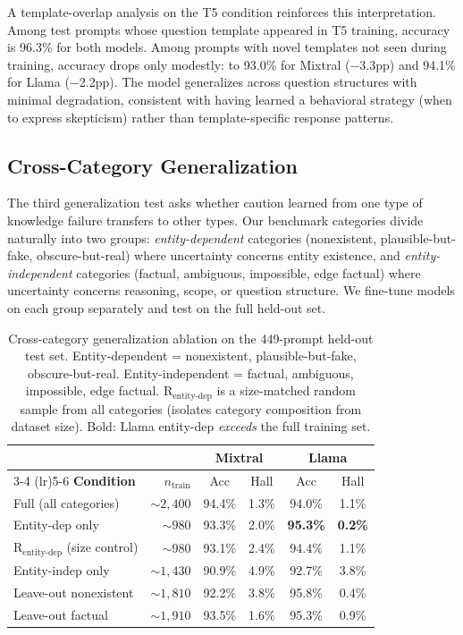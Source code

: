 A template-overlap analysis on the T5 condition reinforces this interpretation. Among test prompts whose question template appeared in T5 training, accuracy is 96.3\% for both models. Among prompts with novel templates not seen during training, accuracy drops only modestly: to 93.0\% for Mixtral ($-$3.3pp) and 94.1\% for Llama ($-$2.2pp). The model generalizes across question structures with minimal degradation, consistent with having learned a behavioral strategy (when to express skepticism) rather than template-specific response patterns.

\subsection{Cross-Category Generalization}
\label{sec:cross-category}

The third generalization test asks whether caution learned from one type of knowledge failure transfers to other types. Our benchmark categories divide naturally into two groups: \emph{entity-dependent} categories (nonexistent, plausible-but-fake, obscure-but-real) where uncertainty concerns entity existence, and \emph{entity-independent} categories (factual, ambiguous, impossible, edge factual) where uncertainty concerns reasoning, scope, or question structure. We fine-tune models on each group separately and test on the full held-out set.

\begin{table}[ht]
\centering
\small
\begin{tabular}{@{}lrcccc@{}}
\toprule
& & \multicolumn{2}{c}{\textbf{Mixtral}} & \multicolumn{2}{c}{\textbf{Llama}} \\
\cmidrule(lr){3-4} \cmidrule(lr){5-6}
\textbf{Condition} & $n_{\text{train}}$ & Acc & Hall & Acc & Hall \\
\midrule
Full (all categories) & ${\sim}2{,}400$ & 94.4\% & 1.3\% & 94.0\% & 1.1\% \\
Entity-dep only & ${\sim}980$ & 93.3\% & 2.0\% & \textbf{95.3\%} & \textbf{0.2\%} \\
R$_{\text{entity-dep}}$ (size control) & ${\sim}980$ & 93.1\% & 2.4\% & 94.4\% & 1.1\% \\
Entity-indep only & ${\sim}1{,}430$ & 90.9\% & 4.9\% & 92.7\% & 3.8\% \\
\addlinespace
Leave-out nonexistent & ${\sim}1{,}810$ & 92.2\% & 3.8\% & 95.8\% & 0.4\% \\
Leave-out factual & ${\sim}1{,}910$ & 93.5\% & 1.6\% & 95.3\% & 0.9\% \\
\bottomrule
\end{tabular}
\caption{Cross-category generalization ablation on the 449-prompt held-out test set. Entity-dependent = nonexistent, plausible-but-fake, obscure-but-real. Entity-independent = factual, ambiguous, impossible, edge factual. R$_{\text{entity-dep}}$ is a size-matched random sample from all categories (isolates category composition from dataset size). Bold: Llama entity-dep \emph{exceeds} the full training set.}
\label{tab:cross-category}
\end{table}

